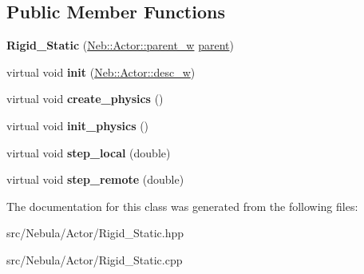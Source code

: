 \subsection*{\-Public \-Member \-Functions}
\begin{DoxyCompactItemize}
\item 
\hypertarget{classNeb_1_1Actor_1_1Rigid__Static_ab6c786470b420f443c231a26b88fe924}{{\bfseries \-Rigid\-\_\-\-Static} (\hyperlink{classNeb_1_1weak__ptr}{\-Neb\-::\-Actor\-::parent\-\_\-w} \hyperlink{classNeb_1_1Actor_1_1parent}{parent})}\label{classNeb_1_1Actor_1_1Rigid__Static_ab6c786470b420f443c231a26b88fe924}

\item 
\hypertarget{classNeb_1_1Actor_1_1Rigid__Static_ae0639d5b9d7c47732d96c41787a6a25e}{virtual void {\bfseries init} (\hyperlink{classNeb_1_1weak__ptr}{\-Neb\-::\-Actor\-::desc\-\_\-w})}\label{classNeb_1_1Actor_1_1Rigid__Static_ae0639d5b9d7c47732d96c41787a6a25e}

\item 
\hypertarget{classNeb_1_1Actor_1_1Rigid__Static_a2ffe179c864cd2572e9c92f2b2ea9c63}{virtual void {\bfseries create\-\_\-physics} ()}\label{classNeb_1_1Actor_1_1Rigid__Static_a2ffe179c864cd2572e9c92f2b2ea9c63}

\item 
\hypertarget{classNeb_1_1Actor_1_1Rigid__Static_a743ebf9c4e047adf672e3eacd88978d8}{virtual void {\bfseries init\-\_\-physics} ()}\label{classNeb_1_1Actor_1_1Rigid__Static_a743ebf9c4e047adf672e3eacd88978d8}

\item 
\hypertarget{classNeb_1_1Actor_1_1Rigid__Static_a66a9cc916cbcab9ffa9ad6b59fa20f54}{virtual void {\bfseries step\-\_\-local} (double)}\label{classNeb_1_1Actor_1_1Rigid__Static_a66a9cc916cbcab9ffa9ad6b59fa20f54}

\item 
\hypertarget{classNeb_1_1Actor_1_1Rigid__Static_a848ce7ac85a565add902b15bc75942b8}{virtual void {\bfseries step\-\_\-remote} (double)}\label{classNeb_1_1Actor_1_1Rigid__Static_a848ce7ac85a565add902b15bc75942b8}

\end{DoxyCompactItemize}


\-The documentation for this class was generated from the following files\-:\begin{DoxyCompactItemize}
\item 
src/\-Nebula/\-Actor/\-Rigid\-\_\-\-Static.\-hpp\item 
src/\-Nebula/\-Actor/\-Rigid\-\_\-\-Static.\-cpp\end{DoxyCompactItemize}
